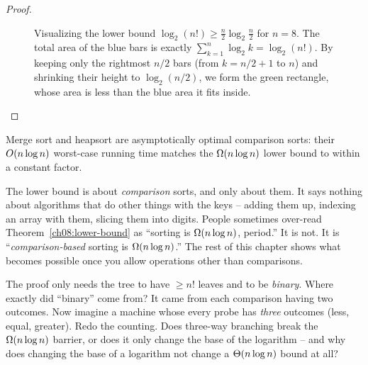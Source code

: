 \begin{proof}
\begin{figure}[H]
\caption{Visualizing the lower bound $\log_2(n!) \ge \frac{n}{2}\log_2\frac{n}{2}$ for $n=8$. The total area of the blue bars is exactly $\sum_{k=1}^n \log_2 k = \log_2(n!)$. By keeping only the rightmost $n/2$ bars (from $k=n/2+1$ to $n$) and shrinking their height to $\log_2(n/2)$, we form the green rectangle, whose area is less than the blue area it fits inside.}
\label{ch08:factorial-bound}
\end{figure}
\end{proof}

\begin{corollary}
Merge sort and heapsort are asymptotically optimal comparison sorts: their
$O(n\log n)$ worst-case running time matches the $\Omega(n\log n)$ lower bound
to within a constant factor.
\end{corollary}

\begin{trapbox}
The lower bound is about \emph{comparison} sorts, and only about them. It says
nothing about algorithms that do other things with the keys -- adding them up,
indexing an array with them, slicing them into digits. People sometimes
over-read Theorem~\ref{ch08:lower-bound} as ``sorting is $\Omega(n\log n)$,
period.'' It is not. It is ``\emph{comparison-based} sorting is
$\Omega(n\log n)$.'' The rest of this chapter shows what becomes possible
once you allow operations other than comparisons.
\end{trapbox}

\begin{walkbox}
The proof only needs the tree to
have $\ge n!$ leaves and to be \emph{binary}. Where exactly did ``binary'' come
from? It came from each comparison having two outcomes. Now imagine a
machine whose every probe has \emph{three} outcomes (less, equal, greater).
Redo the counting. Does three-way branching break the $\Omega(n\log n)$ barrier,
or does it only change the base of the logarithm -- and why does changing the
base of a logarithm not change a $\Theta(n\log n)$ bound at all?
\end{walkbox}

